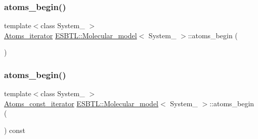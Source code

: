 \mbox{\label{group__grp__iters_gac48ce4662bcb0dd1430309447f96422b}} 
\subsubsection{\texorpdfstring{atoms\+\_\+begin()}{atoms\_begin()}\hspace{0.1cm}{\footnotesize\ttfamily [3/8]}}
{\footnotesize\ttfamily template$<$class System\+\_\+ $>$ \\
\hyperlink{group__grp__iters_ga458a89ea78f235b807ca0d2dfd9a0427}{Atoms\+\_\+iterator} \hyperlink{classESBTL_1_1Molecular__model}{E\+S\+B\+T\+L\+::\+Molecular\+\_\+model}$<$ System\+\_\+ $>$\+::atoms\+\_\+begin (\begin{DoxyParamCaption}{ }\end{DoxyParamCaption})\hspace{0.3cm}{\ttfamily [inline]}}

\mbox{\label{group__grp__iters_ga18c69b2f15720e367ae3d766f3bbe704}} 
\subsubsection{\texorpdfstring{atoms\+\_\+begin()}{atoms\_begin()}\hspace{0.1cm}{\footnotesize\ttfamily [4/8]}}
{\footnotesize\ttfamily template$<$class System\+\_\+ $>$ \\
\hyperlink{group__grp__iters_ga41096063f109fca33976a17af4b3a1e4}{Atoms\+\_\+const\+\_\+iterator} \hyperlink{classESBTL_1_1Molecular__model}{E\+S\+B\+T\+L\+::\+Molecular\+\_\+model}$<$ System\+\_\+ $>$\+::atoms\+\_\+begin (\begin{DoxyParamCaption}{ }\end{DoxyParamCaption}) const\hspace{0.3cm}{\ttfamily [inline]}}

\mbox{\label{group__grp__iters_gafd79068d582c1a588cf3843fcac1d55d}} 
